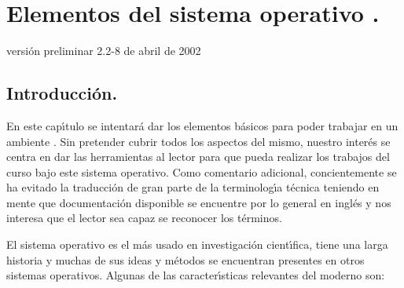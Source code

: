 \chapter{Elementos del sistema operativo \unix.}


\vspace{-1cm}
\hfill {\tiny versi{\'o}n preliminar 2.2-8 de abril de 2002}

\section{Introducci{\'o}n.} 

En este cap{\'\i}tulo se intentar{\'a} dar los elementos b{\'a}sicos para poder
trabajar en un ambiente \unix. Sin pretender cubrir todos los aspectos
del mismo, nuestro inter{\'e}s se centra en dar las herramientas al lector
para que pueda realizar los trabajos del curso bajo este sistema
operativo.  Como comentario adicional, concientemente se ha evitado la
traducci{\'o}n de gran parte de la terminolog{\'\i}a t{\'e}cnica teniendo en mente
que  documentaci{\'o}n disponible se encuentre por lo general  en ingl{\'e}s y nos
interesa que el lector sea capaz se reconocer los t{\'e}rminos.


El sistema operativo {\unix} es el m{\'a}s usado en investigaci{\'o}n
cient{\'\i}fica, tiene una larga historia y muchas de sus ideas y m{\'e}todos
se encuentran presentes en otros sistemas operativos. Algunas de las
caracter{\'\i}sticas relevantes del {\unix} moderno son:

